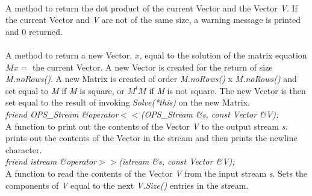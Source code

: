  \\
A method to return the dot product of the current Vector and the
Vector {\em V}. If the current Vector and {\em V} are not of the same
size, a warning message is printed and $0$ returned. \\ 

 \\
A method to return a new Vector, $x$, equal to the solution of the
matrix equation $Mx=$ the current Vector. A new Vector is created for
the return of size {\em M.noRows()}. A new Matrix is created of order
{\em M.noRows()} x {\em M.noRows()} and set equal to {\em M} if {\em
M} is square, or $M^tM$ if {\em M} is not square. The new Vector is
then set equal to the result of invoking {\em Solve(*this)} on the new
Matrix. \\ 

{\em friend OPS_Stream \&operator$<<$(OPS_Stream \&s, const Vector \&V);} \\
A function to print out the contents of the Vector {\em V} to the
output stream {\em s}. prints out the contents of the Vector in the
stream and then prints the newline character. \\

{\em friend istream \&operator$>>$(istream \&s, const Vector \&V);} \\
A function to read the contents of the Vector {\em V} from the input
stream {\em s}. Sets the components of {\em V} equal to the next {\em
V.Size()} entries in the stream.\\ 






